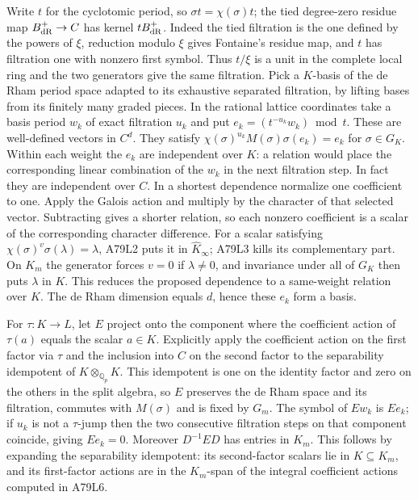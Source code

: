 Write $t$ for the cyclotomic period, so $\sigma t=\chi(\sigma)t$;
the tied degree-zero residue map $B_{\rm dR}^+\to C$ has kernel
$tB_{\rm dR}^+$. Indeed the tied filtration is the one defined by
the powers of $\xi$, reduction modulo $\xi$ gives Fontaine's
residue map, and $t$ has filtration one with nonzero first symbol.
Thus $t/\xi$ is a unit in the complete local ring and the two
generators give the same filtration. Pick a $K$-basis of the
de Rham period space adapted to its exhaustive separated filtration,
by lifting bases from its finitely many graded pieces. In the rational
lattice coordinates take a basis period $w_k$ of exact filtration $u_k$
and put $e_k=(t^{-u_k}w_k)\bmod t$. These are well-defined
vectors in $C^d$. They satisfy
$\chi(\sigma)^{u_k}M(\sigma)\sigma(e_k)=e_k$ for $\sigma\in G_K$.
Within each weight the $e_k$ are independent over $K$: a relation
would place the corresponding linear combination of the $w_k$ in
the next filtration step. In fact they are independent over $C$.
In a shortest dependence normalize one coefficient to one. Apply
the Galois action and multiply by the character of that selected
vector. Subtracting gives a shorter relation, so each nonzero
coefficient is a scalar of the corresponding character difference.
For a scalar satisfying $\chi(\sigma)^v\sigma(\lambda)=\lambda$,
A79L2 puts it in $\widehat K_\infty$; A79L3 kills its complementary
part. On $K_m$ the generator forces $v=0$ if $\lambda\ne0$,
and invariance under all of $G_K$ then puts $\lambda$ in $K$.
This reduces the proposed dependence to a same-weight relation
over $K$. The de Rham dimension equals $d$, hence these $e_k$
form a basis.

For $\tau:K\to L$, let $E$ project onto the component where
the coefficient action of $\tau(a)$ equals the scalar $a\in K$.
Explicitly apply the coefficient action on the first factor via
$\tau$ and the inclusion into $C$ on the second factor to the
separability idempotent of $K\otimes_{\mathbb Q_p}K$.
This idempotent is one on the identity factor and zero on the others
in the split algebra, so $E$ preserves the de Rham space and its
filtration, commutes with $M(\sigma)$ and is fixed by $G_m$.
The symbol of $Ew_k$ is $Ee_k$; if $u_k$ is not a
$\tau$-jump then the two consecutive filtration steps on that
component coincide, giving $Ee_k=0$. Moreover $D^{-1}ED$ has
entries in $K_m$. This follows by expanding the separability
idempotent: its second-factor scalars lie in $K\subseteq K_m$,
and its first-factor actions are in the $K_m$-span of the integral
coefficient actions computed in A79L6.

